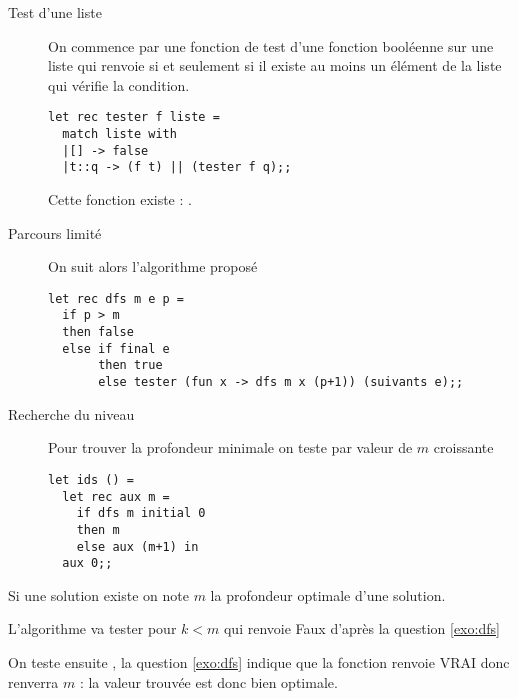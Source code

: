 \begin{Exercise} 
\begin{description}
\item[Test d'une liste] 

On commence par une fonction de test d'une fonction booléenne sur une liste qui renvoie  si et seulement si il existe au moins un élément de la liste qui vérifie la condition.
\begin{lstlisting} 
let rec tester f liste = 
  match liste with
  |[] -> false
  |t::q -> (f t) || (tester f q);;
\end{lstlisting} 
Cette fonction existe : .
\item[Parcours limité]
On suit alors l'algorithme proposé
\begin{lstlisting} 
let rec dfs m e p = 
  if p > m
  then false
  else if final e
       then true
       else tester (fun x -> dfs m x (p+1)) (suivants e);; 
\end{lstlisting} 
\item[Recherche du niveau]
Pour trouver la profondeur minimale on teste par valeur de $m$ croissante
\begin{lstlisting} 
let ids () =
  let rec aux m =
    if dfs m initial 0
    then m
    else aux (m+1) in
  aux 0;;
\end{lstlisting} 
\end{description}
\end{Exercise}
\begin{Exercise}
Si une solution existe on note $m$ la profondeur optimale d'une solution.

L'algorithme  va tester  pour $k<m$ qui renvoie Faux d'après la question \ref{exo:dfs}

On teste ensuite  , la question \ref{exo:dfs} indique que la fonction  renvoie VRAI donc  renverra $m$ : la valeur trouvée est donc bien optimale. 
\end{Exercise}
